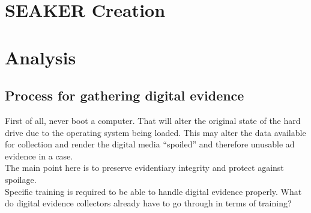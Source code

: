 \documentclass[12pt]{article}
\begin{document}
\section{SEAKER Creation}
\label{sect-Creation}

\section{Analysis}
\label{sect-analysis}

\subsection{Process for gathering digital evidence}

First of all, never boot a computer.  That will alter the original state of the hard drive due to the operating
system being loaded.  This may alter the data available for collection and render the digital media ``spoiled'' and
therefore unusable ad evidence in a case.\\

The main point here is to preserve evidentiary integrity and protect against spoilage.\\

Specific training is required to be able to handle digital evidence properly.  What do digital evidence collectors
already have to go through in terms of training?\\

\newpage
\end{document}
